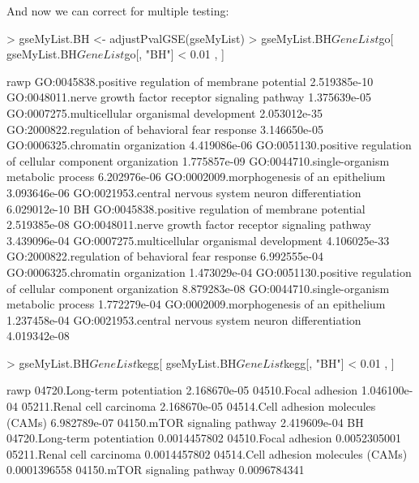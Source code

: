 \documentclass[11pt]{article}
\renewenvironment{Schunk}{\vspace{\topsep}}{\vspace{\topsep}}
\begin{document}
And now we can correct for multiple testing:

\begin{Schunk}
\begin{Sinput}
> gseMyList.BH <- adjustPvalGSE(gseMyList)
> gseMyList.BH$GeneList$go[ gseMyList.BH$GeneList$go[, "BH"] < 0.01 , ]
\end{Sinput}
\begin{Soutput}
                                                                          rawp
GO:0045838.positive regulation of membrane potential              2.519385e-10
GO:0048011.nerve growth factor receptor signaling pathway         1.375639e-05
GO:0007275.multicellular organismal development                   2.053012e-35
GO:2000822.regulation of behavioral fear response                 3.146650e-05
GO:0006325.chromatin organization                                 4.419086e-06
GO:0051130.positive regulation of cellular component organization 1.775857e-09
GO:0044710.single-organism metabolic process                      6.202976e-06
GO:0002009.morphogenesis of an epithelium                         3.093646e-06
GO:0021953.central nervous system neuron differentiation          6.029012e-10
                                                                            BH
GO:0045838.positive regulation of membrane potential              2.519385e-08
GO:0048011.nerve growth factor receptor signaling pathway         3.439096e-04
GO:0007275.multicellular organismal development                   4.106025e-33
GO:2000822.regulation of behavioral fear response                 6.992555e-04
GO:0006325.chromatin organization                                 1.473029e-04
GO:0051130.positive regulation of cellular component organization 8.879283e-08
GO:0044710.single-organism metabolic process                      1.772279e-04
GO:0002009.morphogenesis of an epithelium                         1.237458e-04
GO:0021953.central nervous system neuron differentiation          4.019342e-08
\end{Soutput}
\begin{Sinput}
> gseMyList.BH$GeneList$kegg[ gseMyList.BH$GeneList$kegg[, "BH"] < 0.01 , ]
\end{Sinput}
\begin{Soutput}
                                             rawp
04720.Long-term potentiation         2.168670e-05
04510.Focal adhesion                 1.046100e-04
05211.Renal cell carcinoma           2.168670e-05
04514.Cell adhesion molecules (CAMs) 6.982789e-07
04150.mTOR signaling pathway         2.419609e-04
                                               BH
04720.Long-term potentiation         0.0014457802
04510.Focal adhesion                 0.0052305001
05211.Renal cell carcinoma           0.0014457802
04514.Cell adhesion molecules (CAMs) 0.0001396558
04150.mTOR signaling pathway         0.0096784341
\end{Soutput}
\end{Schunk}
\end{document}
